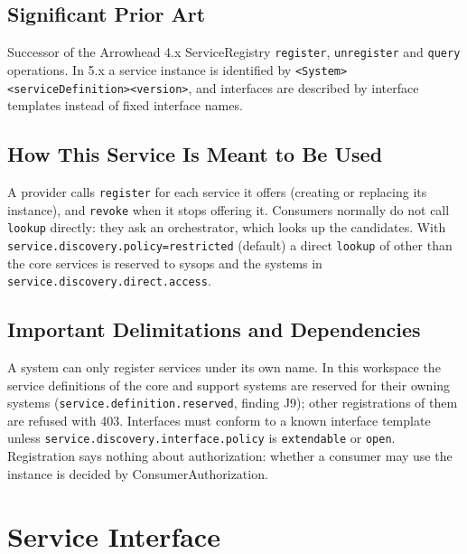 \documentclass[a4paper]{arrowhead}
\begin{document}
\subsection{Significant Prior Art}

Successor of the Arrowhead 4.x ServiceRegistry \texttt{register}, \texttt{unregister} and \texttt{query} operations. In 5.x a service instance is identified by \texttt{\textless{}System\textgreater{}\textbar{}\allowbreak{}\textless{}service\allowbreak{}Definition\textgreater{}\textbar{}\allowbreak{}\textless{}version\textgreater{}}, and interfaces are described by interface templates instead of fixed interface names.

\subsection{How This Service Is Meant to Be Used}

A provider calls \texttt{register} for each service it offers (creating or replacing its instance), and \texttt{revoke} when it stops offering it. Consumers normally do not call \texttt{lookup} directly: they ask an orchestrator, which looks up the candidates. With \texttt{service.\allowbreak{}discovery.\allowbreak{}policy=\allowbreak{}restricted} (default) a direct \texttt{lookup} of other than the core services is reserved to sysops and the systems in \texttt{service.\allowbreak{}discovery.\allowbreak{}direct.\allowbreak{}access}.

\subsection{Important Delimitations and Dependencies}
\label{sec:delimitations}

A system can only register services under its own name. In this workspace the service definitions of the core and support systems are reserved for their owning systems (\texttt{service.\allowbreak{}definition.\allowbreak{}reserved}, finding J9); other registrations of them are refused with 403. Interfaces must conform to a known interface template unless \texttt{service.\allowbreak{}discovery.\allowbreak{}interface.\allowbreak{}policy} is \texttt{extendable} or \texttt{open}. Registration says nothing about authorization: whether a consumer may use the instance is decided by Consumer\allowbreak{}Authorization.

\newpage

\section{Service Interface}
\label{sec:operations}
\end{document}
